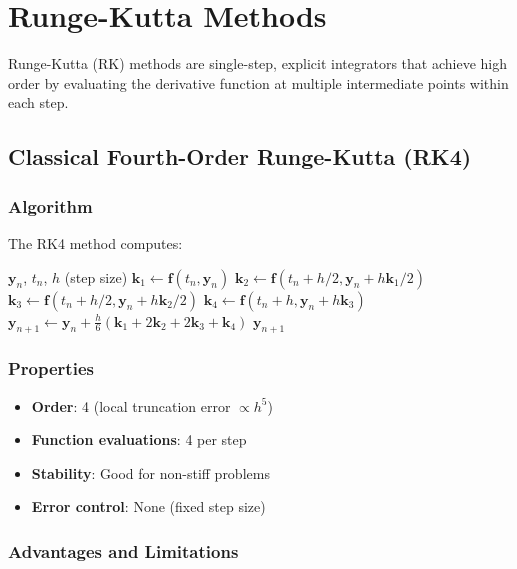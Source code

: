 \section{Runge-Kutta Methods}

Runge-Kutta (RK) methods are single-step, explicit integrators that achieve high order by evaluating the derivative function at multiple intermediate points within each step.

\subsection{Classical Fourth-Order Runge-Kutta (RK4)}

\subsubsection{Algorithm}

The RK4 method computes:

\begin{algorithm}[H]
\caption{RK4 Integration Step}
\begin{algorithmic}[1]
\REQUIRE $\mathbf{y}_n$, $t_n$, $h$ (step size)
\STATE $\mathbf{k}_1 \gets \mathbf{f}(t_n, \mathbf{y}_n)$
\STATE $\mathbf{k}_2 \gets \mathbf{f}(t_n + h/2, \mathbf{y}_n + h\mathbf{k}_1/2)$
\STATE $\mathbf{k}_3 \gets \mathbf{f}(t_n + h/2, \mathbf{y}_n + h\mathbf{k}_2/2)$
\STATE $\mathbf{k}_4 \gets \mathbf{f}(t_n + h, \mathbf{y}_n + h\mathbf{k}_3)$
\STATE $\mathbf{y}_{n+1} \gets \mathbf{y}_n + \frac{h}{6}(\mathbf{k}_1 + 2\mathbf{k}_2 + 2\mathbf{k}_3 + \mathbf{k}_4)$
\RETURN $\mathbf{y}_{n+1}$
\end{algorithmic}
\end{algorithm}

\subsubsection{Properties}

\begin{itemize}
    \item \textbf{Order}: 4 (local truncation error $\propto h^5$)
    \item \textbf{Function evaluations}: 4 per step
    \item \textbf{Stability}: Good for non-stiff problems
    \item \textbf{Error control}: None (fixed step size)
\end{itemize}

\subsubsection{Advantages and Limitations}

